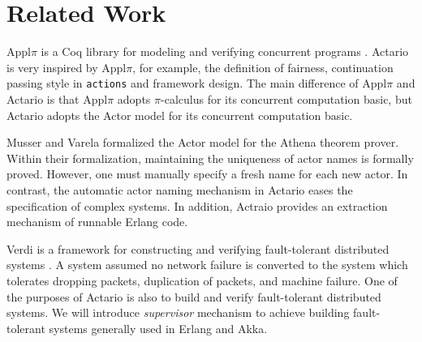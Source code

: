 \section{Related Work}
\label{sec:relatedwork}

Appl\(\pi\) is a Coq library for modeling and verifying concurrent programs \cite{Affeldt200817}.
Actario is very inspired by Appl\(\pi\), for example, the definition of fairness, continuation passing style in \texttt{actions} and framework design.
The main difference of Appl\(\pi\) and Actario is that Appl\(\pi\) adopts \(\pi\)-calculus for its concurrent computation basic, but Actario adopts the Actor model for its concurrent computation basic.

Musser and Varela\cite{Musser:2013aa} formalized the Actor model for the Athena theorem prover\cite{Athena}. %
Within their formalization, maintaining the uniqueness of actor names is formally proved.
However, one must manually specify a fresh name for each new actor.
In contrast, the automatic actor naming mechanism in Actario eases the specification of complex systems.
In addition, Actraio provides an extraction mechanism of runnable Erlang code.


Verdi is a framework for constructing and verifying fault-tolerant distributed systems \cite{Verdi}.
A system assumed no network failure is converted to the system which tolerates dropping packets, duplication of packets, and machine failure.
One of the purposes of Actario is also to build and verify fault-tolerant distributed systems.
We will introduce \textit{supervisor} mechanism to achieve building fault-tolerant systems generally used in Erlang and Akka.



